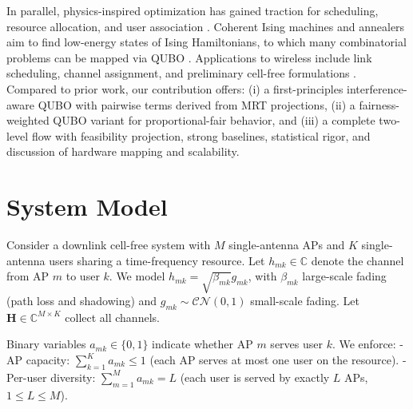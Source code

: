 In parallel, physics-inspired optimization has gained traction for scheduling, resource allocation, and user association \cite{kasi2021resource,grassl2022ising}. Coherent Ising machines and annealers aim to find low-energy states of Ising Hamiltonians, to which many combinatorial problems can be mapped via QUBO \cite{lucas2014ising,mcmahon2016fully,inagaki2016coherent,glover2018tutorial}. Applications to wireless include link scheduling, channel assignment, and preliminary cell-free formulations \cite{zhao2022joint}. Compared to prior work, our contribution offers: (i) a first-principles interference-aware QUBO with pairwise terms derived from MRT projections, (ii) a fairness-weighted QUBO variant for proportional-fair behavior, and (iii) a complete two-level flow with feasibility projection, strong baselines, statistical rigor, and discussion of hardware mapping and scalability.

\section{System Model}
Consider a downlink cell-free system with $M$ single-antenna APs and $K$ single-antenna users sharing a time-frequency resource. Let $h_{mk}\in\mathbb{C}$ denote the channel from AP $m$ to user $k$. We model $h_{mk}=\sqrt{\beta_{mk}} g_{mk}$, with $\beta_{mk}$ large-scale fading (path loss and shadowing) and $g_{mk}\sim \mathcal{CN}(0,1)$ small-scale fading. Let $\mathbf{H}\in \mathbb{C}^{M\times K}$ collect all channels.

Binary variables $a_{mk}\in\{0,1\}$ indicate whether AP $m$ serves user $k$. We enforce:
- AP capacity: $\sum_{k=1}^K a_{mk}\le 1$ (each AP serves at most one user on the resource).
- Per-user diversity: $\sum_{m=1}^M a_{mk}=L$ (each user is served by exactly $L$ APs, $1\le L\le M$).

